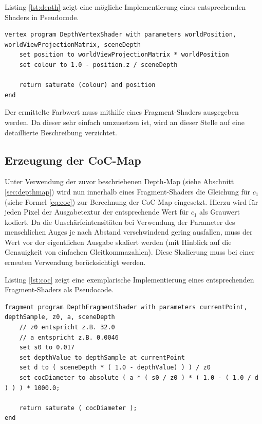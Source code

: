 \documentclass{acmsiggraph}                     %
\begin{document}
Listing \ref{lst:depth} zeigt eine mögliche Implementierung eines entsprechenden Shaders in Pseudocode. 

\begin{lstlisting}[caption=Pseudocode fur den Vertex-Shader zur Erzeugung der Depth-Map.,language=pseudo,label={lst:depth}]
vertex program DepthVertexShader with parameters worldPosition, worldViewProjectionMatrix, sceneDepth
	set position to worldViewProjectionMatrix * worldPosition 
	set colour to 1.0 - position.z / sceneDepth
	
	return saturate (colour) and position
end
\end{lstlisting}

Der ermittelte Farbwert muss mithilfe eines Fragment-Shaders ausgegeben werden. Da dieser sehr einfach umzusetzen ist, wird an dieser Stelle auf eine detaillierte Beschreibung verzichtet.

\subsection{Erzeugung der CoC-Map}

Unter Verwendung der zuvor beschriebenen Depth-Map (siehe Abschnitt \ref{sec:depthmap}) wird nun innerhalb eines Fragment-Shaders die Gleichung für $c_1$ (siehe Formel \ref{eq:coc}) zur Berechnung der CoC-Map eingesetzt. Hierzu wird für jeden Pixel der Ausgabetextur der entsprechende Wert für $c_1$ als Grauwert kodiert. Da die Unschärfeintensitäten bei Verwendung der Parameter des menschlichen Auges je nach Abstand verschwindend gering ausfallen, muss der Wert vor der eigentlichen Ausgabe skaliert werden (mit Hinblick auf die Genauigkeit von einfachen Gleitkommazahlen). Diese Skalierung muss bei einer erneuten Verwendung berücksichtigt werden.

Listing \ref{lst:coc} zeigt eine exemplarische Implementierung eines entsprechenden Fragment-Shaders als Pseudocode.

\begin{lstlisting}[caption=Pseudocode für den Fragment-Shader zur Berechnung der CoC-Map.,language=pseudo, label={lst:coc}]
fragment program DepthFragmentShader with parameters currentPoint, depthSample, z0, a, sceneDepth
	// z0 entspricht z.B. 32.0
	// a entspricht z.B. 0.0046
	set s0 to 0.017
	set depthValue to depthSample at currentPoint
	set d to ( sceneDepth * ( 1.0 - depthValue) ) ) / z0
	set cocDiameter to absolute ( a * ( s0 / z0 ) * ( 1.0 - ( 1.0 / d ) ) ) * 1000.0;
	
	return saturate ( cocDiameter );
end
\end{lstlisting}
\end{document}
